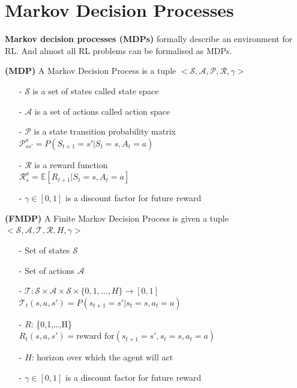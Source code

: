 \section{Markov Decision Processes}

{\bf Markov decision processes (MDPs)} formally describe an environment for RL. 
And almost all RL problems can be formalised as MDPs.

\begin{definition} {\rm\bf (MDP)}
A Markov Decision Process is a tuple $<\mathcal{S}, \mathcal{A}, \mathcal{P}, 
\mathcal{R}, \gamma>$
\begin{itemize}
\setlength{\parskip}{0pt}
\item[-]
$\mathcal{S}$ is a set of states called state space

\item[-]
$\mathcal{A}$ is a set of actions called action space

\item[-]
$\mathcal{P}$ is a state transition probability matrix \\
$\mathcal{P}^a_{ss'}=P(S_{t+1}=s'|S_t=s,A_t=a)$

\item[-]
$\mathcal{R}$ is a reward function \\
$ \mathcal{R}^a_s=\mathbb{E}\left[R_{t+1}|S_t=s,A_t=a\right]$

\item[-]
$\gamma\in[0, 1]$ is a discount factor for future reward

\end{itemize}
\end{definition}


\begin{definition}\label{def_FMDP} {\rm\bf (FMDP)}
A Finite Markov Decision Process is given a tuple $<\mathcal{S}, \mathcal{A}, \mathcal{T}, 
\mathcal{R}, H, \gamma>$
\begin{itemize}
\setlength{\parskip}{0pt}
\item[-]
Set of states $\mathcal{S}$

\item[-]
Set of actions $\mathcal{A}$

\item[-]
$\mathcal{T}: \mathcal{S}\times\mathcal{A}\times\mathcal{S}\times\{0,1,\ldots,H\}
\rightarrow [0,1]$ \\
$\mathcal{T}_t(s,a,s')=P(s_{t+1}=s'|s_t=s,a_t=a)$

\item[-]
$R$: \times{}\times{}\times\{0,1,\ldots,H\}
\rightarrow {} \\
$R_t(s,a,s')=\text{reward for} (s_{t+1}=s', s_t=s, a_t=a)$

\item[-]
$H$: horizon over which the agent will act

\item[-]
$\gamma\in[0, 1]$ is a discount factor for future reward

\end{itemize}
\end{definition}

